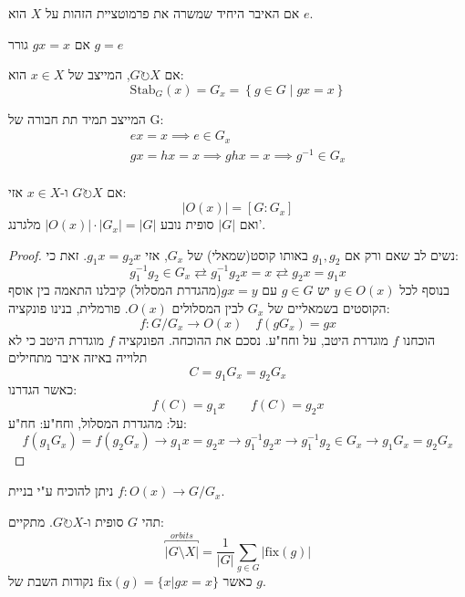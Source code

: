 \documentclass{tstextbook}
\begin{document}
\begin{definition}
אם האיבר היחיד שמשרה את פרמוטציית הזהות על \(X\) הוא \(e\).

\end{definition}
\begin{definition}
אם \(gx=x\) גורר \(g=e\)

\end{definition}
\begin{definition}[מייצב]
אם \(G\circlearrowright X\), המייצב של \(x \in X\) הוא:
$$\text{Stab}_{G}(x)=G_{x}=\left\{  g\in G \;\big|\;gx=x  \right\}$$

\end{definition}
\begin{proposition}
המייצב תמיד תת חבורה של G:
\begin{gather*}ex=x\implies e\in  G_{x} \\gx=hx=x\implies ghx=x\implies g^{-1} \in  G_{x} \\
\end{gather*}

\end{proposition}
\begin{theorem}
אם \(G\circlearrowright X\) ו-\(x \in X\) אזי:
$$|O(x)|=[G:G_x]$$
ואם \(|G|\) סופית נובע \(|O(x)|\cdot|G_{x}|=|G|\) מלגרנג'.

\end{theorem}
\begin{proof}
נשים לב שאם ורק אם \(g_{1},g_{2}\) באותו קוסט(שמאלי) של \(G_{x}\), אזי \(g_{1}x=g_{2}x\). זאת כי:
$$g_{1}^{-1} g_{2}\in G_{x}\rightleftarrows g_{1}^{-1} g_{2}x=x \rightleftarrows g_{2}x=g_{1}x$$
בנוסף לכל \(y\in O(x)\) יש \(g \in G\) עם \(gx=y\)(מהגדרת המסלול)
קיבלנו התאמה בין אוסף הקוסטים בשמאליים של \(G_{x}\) לבין המסלולים \(O(x)\).
פורמלית, בנינו פונקציה:
$$f:G/G_{x}\to O(x)\quad f(gG_{x})=gx$$
הוכחנו \(f\) מוגדרת היטב, על וחח"ע.
נסכם את ההוכחה. הפונקציה \(f\) מוגדרת היטב כי לא תלוייה באיזה איבר מתחילים
$$C=g_{1}G_{x}=g_{2}G_{x}$$
כאשר הגדרנו:
$$f(C)=g_{1}x\qquad f(C)=g_{2}x$$
על: מהגדרת המסלול, וחח"ע:
חח"ע:
$$f(g_{1}G_{x})=f(g_{2}G_{x})\to g_{1}x=g_{2}x\to g_{1}^{-1} g_{2}x\to g_{1}^{-1} g_{2}\in G_{x}\to g_{1}G_{x}=g_{2}G_{x}$$

\end{proof}
\begin{remark}
ניתן להוכיח ע"י בניית  \(f:O(x)\to G/G_{x}\).

\end{remark}
\begin{lemma}
תהי \(G\) סופית ו-\(G\circlearrowright X\). מתקיים:
$$\overbracket{ |G\setminus X| }^{ orbits }=\frac{1}{|G|}\sum_{g\in  G}|\mathrm{fix}(g)|$$
כאשר \(\mathrm{fix}(g)=\{ x|gx=x \}\) נקודות השבת של \(g\).

\end{lemma}
\end{document}
